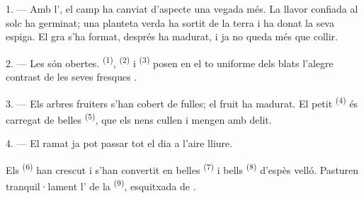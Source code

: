 %


\VUsaut{5.0mm}
\VUsaut{3.0mm}
\VUsaut{3.0mm}
\VUsaut{4.0mm}
\VUsaut{3.0mm}

1. --- Amb l', el camp ha canviat d'aspecte una vegada més. La
llavor confiada al solc ha germinat; una planteta verda ha sortit de la terra i
ha donat la seva espiga. El gra s'ha format, després ha madurat, i ja no queda
més que collir.

2. --- Les  són obertes. 
\textsuperscript{(1)},  \textsuperscript{(2)} i
 \textsuperscript{(3)} posen en el to uniforme dels blats
l'alegre contrast de les seves fresques .

3. --- Els arbres fruiters s'han cobert de fulles; el fruit ha madurat. El petit
 \textsuperscript{(4)} és carregat de belles 
\textsuperscript{(5)}, que els nens cullen i mengen amb delit.

4. --- El ramat ja pot passar tot el dia a l'aire lliure.

Els  \textsuperscript{(6)} han crescut i s'han convertit en belles
 \textsuperscript{(7)} i bells 
\textsuperscript{(8)} d'espès velló. Pasturen tranquil·lament l' de
la  \textsuperscript{(9)}, esquitxada de .

